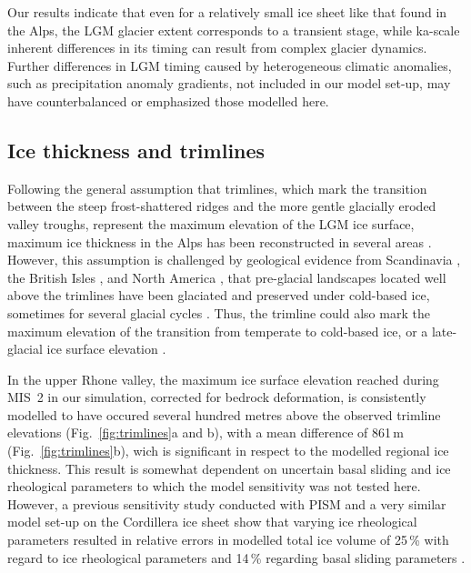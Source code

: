 \documentclass[tc, manuscript]{copernicus}
\begin{document}
    Our results indicate that even for a relatively small ice sheet like that
    found in the Alps, the LGM glacier extent corresponds to a transient
    stage, while ka-scale inherent differences in its timing can
    result from complex glacier dynamics. Further differences in LGM timing
    caused by heterogeneous climatic anomalies, such as precipitation
    anomaly gradients, not included in our model set-up, may have
    counterbalanced or emphasized those modelled here.


\subsection{Ice thickness and trimlines}
\label{sec:thickness}

    Following the general assumption that trimlines, which mark the transition
    between the steep frost-shattered ridges and the more gentle glacially eroded
    valley troughs, represent the maximum elevation of the LGM ice surface,
    maximum ice thickness in the Alps has been reconstructed in several areas
    \citep{Husen.1987, Florineth.1998, Florineth.Schluchter.1998,
    Kelly.etal.2004, Bini.etal.2009, Coutterand.2010, Cossart.etal.2012}.
    However, this assumption is challenged by geological evidence from
    Scandinavia \citep[e.g.,][]{Kleman.1994, Kleman.Borgstrom.1994},
    the British Isles \citep[e.g.,][]{Fabel.etal.2012}, and
    North America \citep[e.g.,][]{Kleman.etal.2010}, that pre-glacial landscapes
    located well above the trimlines have been glaciated and preserved
    under cold-based ice, sometimes for several glacial cycles
    \citep{Stroeven.etal.2002}. Thus, the trimline could also mark the
    maximum elevation of the transition from temperate to cold-based ice, or a
    late-glacial ice surface elevation \citep[Fig.~1, p.~403]{Coutterand.2010}.

    In the upper Rhone valley, the maximum ice surface elevation reached
    during MIS~2 in our simulation, corrected for bedrock deformation, is
    consistently modelled to have occured several hundred metres above the
    observed trimline elevations (Fig.~\ref{fig:trimlines}a and b), with a mean
    difference of 861\,m (Fig.~\ref{fig:trimlines}b), wich is significant in
    respect to the modelled regional ice thickness. This result is
    somewhat dependent on uncertain basal sliding and ice rheological parameters
    to which the model sensitivity was not tested here. However, a previous
    sensitivity study conducted with PISM and a very similar model set-up on
    the Cordillera ice sheet show that varying ice rheological parameters
    resulted in relative errors in modelled total ice volume of 25\,\unit{\%}
    with regard to ice rheological parameters and 14\,\unit{\%} regarding basal
    sliding parameters \citep[Fig.~7]{Seguinot.etal.2016}.
\end{document}
